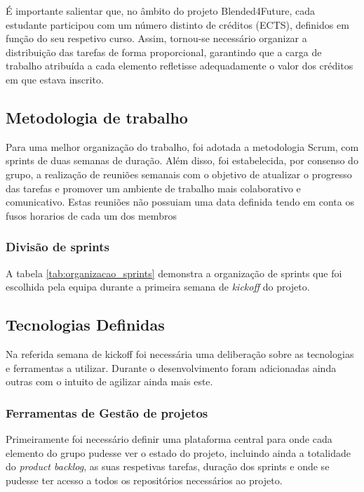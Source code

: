 É importante salientar que, no âmbito do projeto Blended4Future, cada estudante participou com um número distinto de créditos (ECTS), definidos em função do seu respetivo curso. Assim, tornou-se necessário organizar a distribuição das tarefas de forma proporcional, garantindo que a carga de trabalho atribuída a cada elemento refletisse adequadamente o valor dos créditos em que estava inscrito.

\subsection{Metodologia de trabalho}

Para uma melhor organização do trabalho, foi adotada a metodologia Scrum, com sprints de duas semanas de duração. Além disso, foi estabelecida, por consenso do grupo, a realização de reuniões semanais com o objetivo de atualizar o progresso das tarefas e promover um ambiente de trabalho mais colaborativo e comunicativo. Estas reuniões não possuiam uma data definida tendo em conta os fusos horarios de cada um dos membros

\subsubsection{Divisão de sprints}



A tabela \ref{tab:organizacao_sprints} demonstra a organização de sprints que foi escolhida pela equipa durante a primeira semana de \textit{kickoff} do projeto.


\subsection{Tecnologias Definidas}

Na referida semana de kickoff foi necessária uma deliberação sobre as tecnologias e ferramentas a utilizar. Durante o desenvolvimento foram adicionadas ainda outras com o intuito de agilizar ainda mais este.

\subsubsection{Ferramentas de Gestão de projetos}

Primeiramente foi necessário definir uma plataforma central para onde cada elemento do grupo pudesse ver o estado do projeto, incluindo ainda a totalidade do \textit{product backlog}, as suas respetivas tarefas, duração dos sprints e onde se pudesse ter acesso a todos os repositórios necessários ao projeto.

